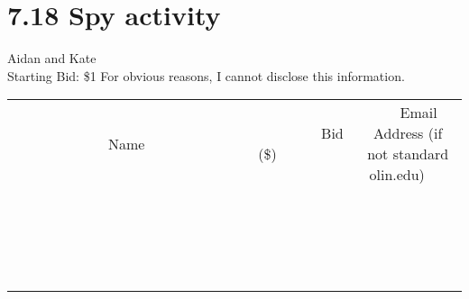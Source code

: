 \documentclass[11pt]{article}
\begin{document}
\section*{7.18 Spy activity}
Aidan and Kate
\\
Starting Bid: \$1
\newline
For obvious reasons, I cannot disclose this information.
\\[3ex]
\begin{tabular}{c c c}
~~~~~~~~~~~~~Name~~~~~~~~~~~~~ & ~~~~~~~~~Bid (\$)~~~~~~~~~  & ~~~Email Address (if not standard olin.edu)~~~\\
 & & \\
\hline
 & & \\
\hline
 & & \\
\hline
 & & \\
\hline
 & & \\
\hline
 & & \\
\hline
 & & \\
\hline
 & & \\
\hline
 & & \\
\hline
 & & \\
\hline
 & & \\
\hline
 & & \\
\hline
 & & \\
\hline
 & & \\
\hline
 & & \\
\hline
 & & \\
\hline
 & & \\
\hline
 & & \\
\hline
 & & \\
\hline
\end{tabular}
\newpage
\end{document}
